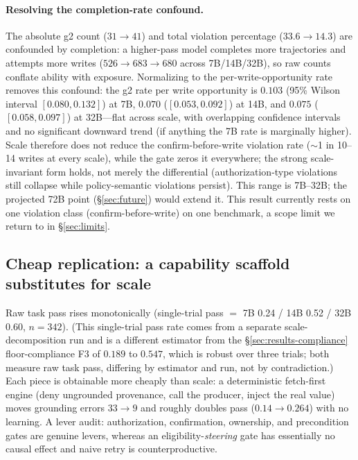 \paragraph{Resolving the completion-rate confound.} The absolute g2 count ($31\to41$) and total violation percentage ($33.6\to14.3$) are confounded by completion: a higher-pass model completes more trajectories and attempts more writes ($526\to683\to680$ across 7B/14B/32B), so raw counts conflate ability with exposure. Normalizing to the per-write-opportunity rate removes this confound: the g2 rate per write opportunity is $0.103$ (95\% Wilson interval $[0.080,0.132]$) at 7B, $0.070$ ($[0.053,0.092]$) at 14B, and $0.075$ ($[0.058,0.097]$) at 32B---flat across scale, with overlapping confidence intervals and no significant downward trend (if anything the 7B rate is marginally higher). Scale therefore does not reduce the confirm-before-write violation rate ($\sim$1 in 10--14 writes at every scale), while the gate zeros it everywhere; the strong scale-invariant form holds, not merely the differential (authorization-type violations still collapse while policy-semantic violations persist). This range is 7B--32B; the projected 72B point (\S\ref{sec:future}) would extend it. This result currently rests on one violation class (confirm-before-write) on one benchmark, a scope limit we return to in \S\ref{sec:limits}.

\subsection{Cheap replication: a capability scaffold substitutes for scale}\label{sec:results-cheaprep}%
Raw task pass rises monotonically (single-trial pass $=$ 7B 0.24 / 14B 0.52 / 32B 0.60, $n{=}342$). (This single-trial pass rate comes from a separate scale-decomposition run and is a different estimator from the \S\ref{sec:results-compliance} floor-compliance F3 of $0.189$ to $0.547$, which is robust over three trials; both measure raw task pass, differing by estimator and run, not by contradiction.) Each piece is obtainable more cheaply than scale: a deterministic fetch-first engine (deny ungrounded provenance, call the producer, inject the real value) moves grounding errors $33\to9$ and roughly doubles pass ($0.14\to0.264$) with no learning. A lever audit: authorization, confirmation, ownership, and precondition gates are genuine levers, whereas an eligibility-\emph{steering} gate has essentially no causal effect and naive retry is counterproductive.

